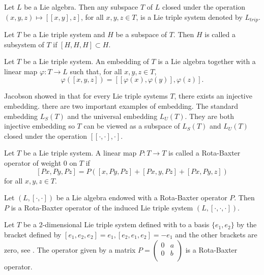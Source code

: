 \documentclass[11pt, twoside]{article}
\begin{document}
\begin{ex}
     Let $L$ be a Lie algebra. Then any subspace $T$ of $L$ closed under the operation $(x,y,z) \mapsto[[x,y],z] $, for all $x,y,z \in T $, is a Lie triple system denoted by $L_{trip} $.
\end{ex}

\begin{defi}
    Let $T$ be a Lie triple system and $H $ be a subspace of $T$. Then $H$ is called a subsystem of $T$ if $[H,H,H]\subset H $.
\end{defi}

\begin{defi}
    Let $T$ be a Lie triple system. An embedding of $T$ is a Lie algebra together with a linear map $\varphi: T\to L $ such that, for all $x,y,z\in T $, $$\varphi([x,y,z])= [[\varphi(x),\varphi(y)],\varphi(z)]. $$
\end{defi}

\begin{ex}
    Jacobson showed in \cite{J51} that for every Lie triple systems $T$, there exists an injective embedding. there are two important examples of embedding. The standard embedding $L_S(T)$ and the universal embedding $L_U(T) $. They are both injective embedding so $T$ can be viewed as a subspace of $L_S(T)$ and $L_U(T)$ closed under the operation $[[\cdot,\cdot],\cdot] $.
\end{ex}

\begin{defi}
    Let $T$ be a Lie triple system. A linear map $P:T\to T$ is called a Rota-Baxter operator of weight $0$ on $T$ if $$[Px,Py,Pz]= P([x,Py,Pz]+[Px,y,Pz]+[Px,Py,z]) $$ for all $x,y,z \in T$.
\end{defi}

\begin{ex}
    Let $(L,[\cdot,\cdot])$ be a Lie algebra endowed with a Rota-Baxter operator $P$. Then $P$ is a Rota-Baxter operator of the induced Lie triple system $(L,[\cdot,\cdot,\cdot]) $.
\end{ex}

\begin{ex}\label{exa4.7}
    Let $T$ be a $2$-dimensional Lie triple system defined with to a basis $\{e_1,e_2\}$ by the bracket defined by $[e_1,e_2,e_2]=e_1, [e_2,e_1,e_2]=-e_1 $ and the other brackets are zero, see \cite{CHMM22}. The operator given by a matrix $P=\begin{pmatrix}
0 & a \\
0 & b \\
\end{pmatrix} $ is a Rota-Baxter operator.
\end{ex}
\end{document}
